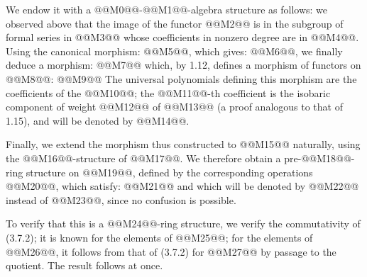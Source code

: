 We endow it with a @@M0@@-@@M1@@-algebra structure as follows: we observed above that the image of the functor @@M2@@ is in the subgroup of formal series in @@M3@@ whose coefficients in nonzero degree are in @@M4@@. Using the canonical morphism: @@M5@@, which gives: @@M6@@, we finally deduce a morphism:
@@M7@@
which, by 1.12, defines a morphism of functors on @@M8@@:
@@M9@@
The universal polynomials defining this morphism are the coefficients of the @@M10@@; the @@M11@@-th coefficient is the isobaric component of weight @@M12@@ of @@M13@@ (a proof analogous to that of 1.15), and will be denoted by @@M14@@.

Finally, we extend the morphism thus constructed to @@M15@@ naturally, using the @@M16@@-structure of @@M17@@. We therefore obtain a pre-@@M18@@-ring structure on @@M19@@, defined by the corresponding operations @@M20@@, which satisfy:
@@M21@@
and which will be denoted by @@M22@@ instead of @@M23@@, since no confusion is possible.

To verify that this is a @@M24@@-ring structure, we verify the commutativity of (3.7.2); it is known for the elements of @@M25@@; for the elements of @@M26@@, it follows from that of (3.7.2) for @@M27@@ by passage to the quotient. The result follows at once.

\providecommand{\Ghat}{\widehat G}
\providecommand{\Aqhat}{\widehat A_{\mathbb Q}}
\providecommand{\Ch}{\operatorname{Ch}}
\providecommand{\Log}{\operatorname{Log}}
\providecommand{\id}{\operatorname{id}}
\providecommand{\gr}{\operatorname{gr}}
\providecommand{\Hom}{\operatorname{Hom}}
\providecommand{\epsi}{\varepsilon}
\providecommand{\clgr}{\operatorname{cl}}
\providecommand{\Fil}{\operatorname{Fil}}
\providecommand{\Gr}{\operatorname{Gr}}
\providecommand{\Sym}{\operatorname{Sym}}

\providecommand{\Ghat}{\widehat G}
\providecommand{\Aqhat}{\widehat A_{\mathbb Q}}
\providecommand{\Ch}{\operatorname{Ch}}
\providecommand{\Log}{\operatorname{Log}}
\renewcommand{\id}{\operatorname{id}}
\providecommand{\gr}{\operatorname{gr}}
\providecommand{\Hom}{\operatorname{Hom}}
\providecommand{\epsi}{\varepsilon}
\providecommand{\clgr}{\operatorname{cl}}
\providecommand{\Fil}{\operatorname{Fil}}
\providecommand{\Gr}{\operatorname{Gr}}
\providecommand{\Sym}{\operatorname{Sym}}

